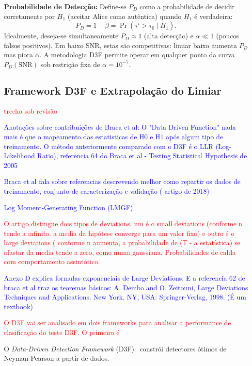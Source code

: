 \documentclass{sbrt}
\newcommand{\bblue}[1]{\textcolor{blue}{#1}}
\newcommand{\rred}[1]{\textcolor{red}{#1}}
\begin{document}
\textbf{Probabilidade de Detecção:} Define-se $P_D$ como a probabilidade de decidir corretamente por $H_1$ (aceitar Alice como autêntica) quando $H_1$ é verdadeira:
\begin{equation}\label{eq:pd}
P_D = 1 - \beta = \Pr(\tau^i > \tau_0 \mid H_1).
\end{equation}
Idealmente, deseja-se simultaneamente $P_D \approx 1$ (alta detecção) e $\alpha \ll 1$ (poucos falsos positivos). Em baixo SNR, estas são competitivas: limiar baixo aumenta $P_D$ mas piora $\alpha$. A metodologia D3F permite operar em qualquer ponto da curva $P_D(\text{SNR})$ sob restrição fixa de $\alpha = 10^{-7}$.


\subsection{Framework D3F e Extrapolação do Limiar}

\rred{trecho sob revisão}

\bblue{Anotações sobre contribuições de Braca et al:
O "Data Driven Function"  nada mais é que o mapeamento das estatisticas de H0 e H1 após algum tipo de treinamento.
O método anteriormente comparado com o D3F é o LLR (Log-Likelihood Ratio), referencia 64 do Braca et al - Testing Statistical Hypothesis de 2005 }

\bblue{ Braca et al fala sobre referencias descrevendo melhor como repartir os dados de treinamento, conjunto de caracterização e validação ( artigo de 2018) }

\bblue{Log
Moment-Generating Function (LMGF)}

\rred{O artigo distingue dois tipos de deviations, um é o small deviations (conforme n tende a infinito, a media da hipótese converge para um valor fixo) e outro é o large deviations ( conforme n aumenta, a probabilidade de (T - a estatística) se afastar da media tende a zero, como numa gaussiana. Probabilidades de calda com comportamento assintótico.}

\bblue{Anexo D explica formulas exponenciais de Large Deviations. E a referencia 62 de braca et al traz os teoremas básicos: A. Dembo and O. Zeitouni, Large Deviations Techniques and Applications.
New York, NY, USA: Springer-Verlag, 1998. (É um textbook)}

\rred{O D3F vai ser analisado em dois frameworks para analisar a performance de clasificação do teste D3F. O primeiro é  }


O \textit{Data-Driven Detection Framework} (D3F)~\cite{ref_braca} constrói detectores ótimos de Neyman-Pearson a partir de dados.
\end{document}
